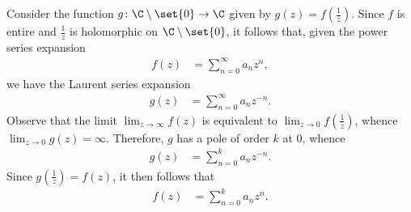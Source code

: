 \documentclass[10pt]{mypackage}
\begin{document}
\begin{solution}
  Consider the function $g\colon \C\setminus \set{0} \rightarrow \C$ given by $g(z) = f\left( \frac{1}{z} \right)$. Since $f$ is entire and $\frac{1}{z}$ is holomorphic on $\C\setminus \set{0}$, it follows that, given the power series expansion
  \begin{align*}
    f(z) &= \sum_{n=0}^{\infty}a_nz^{n},
  \end{align*}
  we have the Laurent series expansion
  \begin{align*}
    g(z) &= \sum_{n=0}^{\infty}a_nz^{-n}.
  \end{align*}
  Observe that the limit $\lim_{z\rightarrow\infty} f(z)$ is equivalent to $\lim_{z\rightarrow 0}f\left( \frac{1}{z} \right)$, whence $\lim_{z\rightarrow 0} g(z) = \infty$. Therefore, $g$ has a pole of order $k$ at $0$, whence
  \begin{align*}
    g(z) &= \sum_{n=0}^{k}a_nz^{-n}.
  \end{align*}
  Since $g\left( \frac{1}{z} \right) = f(z)$, it then follows that
  \begin{align*}
    f(z) &= \sum_{n=0}^{k} a_nz^{n}.
  \end{align*}
\end{solution}
\end{document}
